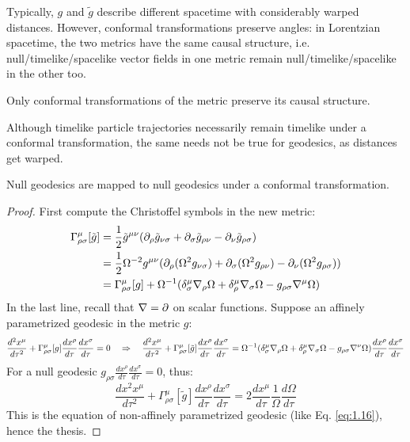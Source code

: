 Typically, $ g $ and $ \tilde{g} $ describe different spacetime with considerably warped distances. However, conformal transformations preserve angles: in Lorentzian spacetime, the two metrics have the same causal structure, i.e. null/timelike/spacelike vector fields in one metric remain null/timelike/spacelike in the other too.

\begin{proposition}
  Only conformal transformations of the metric preserve its causal structure.
\end{proposition}

Although timelike particle trajectories necessarily remain timelike under a conformal transformation, the same needs not be true for geodesics, as distances get warped.

\begin{proposition}
  Null geodesics are mapped to null geodesics under a conformal transformation.
\end{proposition}
\begin{proof}
  First compute the Christoffel symbols in the new metric:
  \begin{equation*}
    \begin{split}
      \Gamma^\mu_{\rho \sigma}[\tilde{g}]
      &= \frac{1}{2} \tilde{g}^{\mu \nu} (\partial_\rho \tilde{g}_{\nu \sigma} + \partial_\sigma \tilde{g}_{\rho \nu} - \partial_\nu \tilde{g}_{\rho \sigma}) \\
      &= \frac{1}{2} \Omega^{-2} g^{\mu \nu} (\partial_\rho (\Omega^2 g_{\nu \sigma}) + \partial_\sigma (\Omega^2 g_{\rho \nu}) - \partial_\nu (\Omega^2 g_{\rho \sigma})) \\
      &= \Gamma^\mu_{\rho \sigma}[g] + \Omega^{-1} (\delta^\mu_\sigma \nabla_\rho \Omega + \delta^\mu_\rho \nabla_\sigma \Omega - g_{\rho \sigma} \nabla^\mu \Omega)
    \end{split}
  \end{equation*}
  In the last line, recall that $ \nabla = \partial $ on scalar functions. Suppose an affinely parametrized geodesic in the metric $ g $:
  \begin{equation*}
    \frac{d^2 x^\mu}{d\tau^2} + \Gamma^\mu_{\rho \sigma}[g] \frac{dx^\rho}{d\tau} \frac{dx^\sigma}{d\tau} = 0
    \quad \Rightarrow \quad
    \frac{d^2 x^\mu}{d\tau^2} + \Gamma^\mu_{\rho \sigma}[\tilde{g}] \frac{dx^\rho}{d\tau} \frac{dx^\sigma}{d\tau} = \Omega^{-1} (\delta^\mu_\sigma \nabla_\rho \Omega + \delta^\mu_\rho \nabla_\sigma \Omega - g_{\rho \sigma} \nabla^\nu \Omega) \frac{dx^\rho}{d\tau} \frac{dx^\sigma}{d\tau}
  \end{equation*}
  For a null geodesic $ g_{\rho \sigma} \frac{dx^\rho}{d\tau} \frac{dx^\sigma}{d\tau} = 0 $, thus:
  \begin{equation*}
    \frac{dx^2 x^\mu}{d\tau^2} + \Gamma^\mu_{\rho \sigma}[\tilde{g}] \frac{dx^\rho}{d\tau} \frac{dx^\sigma}{d\tau} = 2 \frac{dx^\mu}{d\tau} \frac{1}{\Omega} \frac{d\Omega}{d\tau}
  \end{equation*}
  This is the equation of non-affinely parametrized geodesic (like Eq. \ref{eq:1.16}), hence the thesis.
\end{proof}


